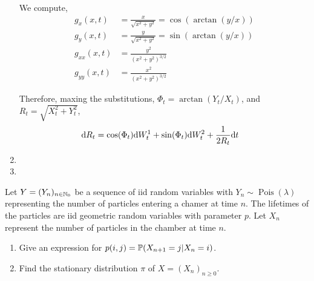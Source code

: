 \begin{solution}[Solution]
\begin{enumerate}[label=(\alph*)]
        We compute,
        \begin{align*}
            g_x(x,t) &= \frac{x}{\sqrt{x^2+y^2}} = \cos(\arctan(y/x)) \\
            g_y(x,t) &= \frac{y}{\sqrt{x^2+y^2}} = \sin(\arctan(y/x)) \\
            g_{xx}(x,t) &= \frac{y^2}{(x^2+y^2)^{3/2}} \\
            g_{yy}(x,t) &= \frac{x^2}{(x^2+y^2)^{3/2}}
        \end{align*}
        
        Therefore, maxing the substitutions, \( \Phi_t = \arctan(Y_t/X_t) \), and \( R_t = \sqrt{X_t^2+Y_t^2}  \),
        \begin{align*}
            \mathrm{d} R_t &= \cos(\Phi_t)\mathrm{d} W_t^1 + \sin(\Phi_t) \mathrm{d} W_t^2 + \frac{1}{2R_t} \mathrm{d} t
        \end{align*}


    \item

    \item 

\end{enumerate}
\end{solution}


\begin{problem}
Let \( Y = (Y_n)_{n\in\mathbb{N}_0} \) be a sequence of iid random variables with \( Y_n\sim \operatorname{Pois}(\lambda) \) representing the number of particles entering a chamer at time \( n \). The lifetimes of the particles are iid geometric random variables with parameter \( p \). Let \( X_n \) represent the number of particles in the chamber at time \( n \).
\begin{enumerate}[nolistsep,label=(\alph*)]
    \item Give an expression for \( p(i,j) = \mathbb{P}(X_{n+1} = j | X_n = i) \).
    \item Find the stationary distribution \( \pi \) of \( X = (X_n)_{n\geq 0} \).
\end{enumerate}
\end{problem}

